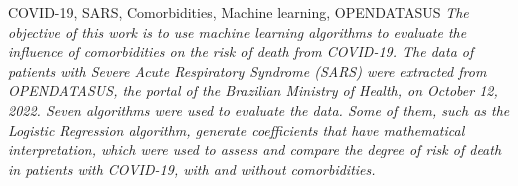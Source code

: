 \documentclass[espec,ppgcdbd]{destufba}
\begin{document}
%
%

    \begin{englishabstract}{COVID-19, SARS, Comorbidities, Machine learning, OPENDATASUS}
        \emph{
            The objective of this work is to use machine learning algorithms to evaluate the influence of comorbidities on the risk of death from COVID-19. The data of patients with Severe Acute Respiratory Syndrome (SARS) were extracted from OPENDATASUS, the portal of the Brazilian Ministry of Health, on October 12, 2022. Seven algorithms were used to evaluate the data. Some of them, such as the Logistic Regression algorithm, generate coefficients that have mathematical interpretation, which were used to assess and compare the degree of risk of death in patients with COVID-19, with and without comorbidities.
        }
    \end{englishabstract}

%
%
%

%
%
%

    \listoftables


\end{document}
